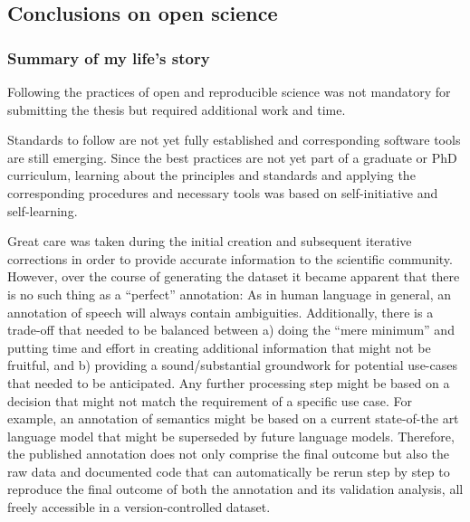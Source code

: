 \subsection{Conclusions on open science}

\subsubsection{Summary of my life's story}






%
Following the practices of open and reproducible science was not mandatory for
submitting the thesis but required additional work and time.

%
Standards to follow are not yet fully established and corresponding software
tools are still emerging.
%
Since the best practices are not yet part of a graduate or PhD curriculum,
learning about the principles and standards and applying the corresponding
procedures and necessary tools was based on self-initiative and self-learning.

%
Great care was taken during the initial creation and subsequent iterative
corrections in order to provide accurate information to the scientific
community.
%
However, over the course of generating the dataset it became apparent that there
is no such thing as a ``perfect'' annotation:
%
As in human language in general, an annotation of speech will always contain
ambiguities.
%
Additionally, there is a trade-off that needed to be balanced between a) doing
the ``mere minimum'' and putting time and effort in creating additional
information that might not be fruitful, and b) providing a sound/substantial
groundwork for potential use-cases that needed to be anticipated.
%
Any further processing step might be based on a decision that might not match
the requirement of a specific use case.
%
For example, an annotation of semantics might be based on a current state-of-the
art language model that might be superseded by future language models.
%
Therefore, the published annotation does not only comprise the final outcome but
also the raw data and documented code that can automatically be rerun step by
step to reproduce the final outcome of both the annotation and its validation
analysis, all freely accessible in a version-controlled dataset.

